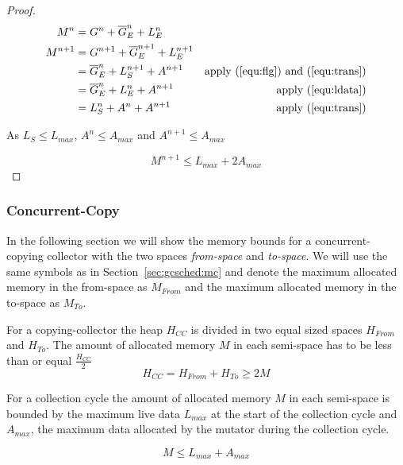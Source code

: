 \begin{proof}
\begin{align}
    M^n & = G^n + \overline{G}_E^n + L_E^n\\
    M^{n+1} & = G^{n+1} + \overline{G}_E^{n+1} + L_E^{n+1}\\
\nonumber
            & = \overline{G}_E^n + L_S^{n+1} + A^{n+1}
                & \mbox{apply (\ref{equ:flg}) and (\ref{equ:trans})}\\
\nonumber
            & = \overline{G}_E^n + L_E^{n} + A^{n+1}
                & \mbox{apply (\ref{equ:ldata})}\\
            & = L_S^{n} + A^n + A^{n+1}
                & \mbox{apply (\ref{equ:trans})}
\end{align}

As $L_S \le L_{max}$, $A^n \le A_{max}$ and $A^{n+1} \le A_{max}$

\begin{equation}
    M^{n+1} \le L_{max} + 2 A_{max}
\end{equation}


\end{proof}

\subsubsection{Concurrent-Copy}

In the following section we will show the memory bounds for a
concurrent-copying collector with the two spaces \emph{from-space}
and \emph{to-space}. We will use the same symbols as in
Section~\ref{sec:gcsched:mc} and denote the maximum allocated memory
in the from-space as $M_{From}$ and the maximum allocated memory in
the to-space as $M_{To}$.

For a copying-collector the heap $H_{CC}$ is divided in two equal
sized spaces $H_{From}$ and $H_{To}$. The amount of allocated memory
$M$ in each semi-space has to be less than or equal
$\frac{H_{CC}}{2}$
%
\begin{equation}\label{equ:ccheapmin}
    H_{CC} = H_{From} + H_{To} \ge 2M
\end{equation}
%

\begin{lemma}

For a collection cycle the amount of allocated memory $M$ in each
semi-space is bounded by the maximum live data $L_{max}$ at the
start of the collection cycle and $A_{max}$, the maximum data
allocated by the mutator during the collection cycle.

\begin{equation}\label{equ:cc:lemma}
    M \le L_{max} + A_{max}
\end{equation}

\end{lemma}

